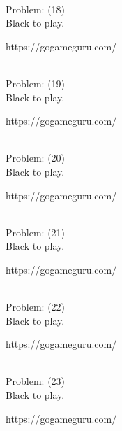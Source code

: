 \documentclass[11pt]{article}
\begin{document}
\begin{minipage}[t]{0.5\textwidth}
  {\centering
  
\\
Problem: (18)\\
Black to play.

https://gogameguru.com/\\
  }
\end{minipage}
\begin{minipage}[t]{0.5\textwidth}
  {\centering
  
\\
Problem: (19)\\
Black to play.

https://gogameguru.com/\\
  }
\end{minipage}
\begin{minipage}[t]{0.5\textwidth}
  {\centering
  
\\
Problem: (20)\\
Black to play.

https://gogameguru.com/\\
  }
\end{minipage}
\begin{minipage}[t]{0.5\textwidth}
  {\centering
  
\\
Problem: (21)\\
Black to play.

https://gogameguru.com/\\
  }
\end{minipage}
\begin{minipage}[t]{0.5\textwidth}
  {\centering
  
\\
Problem: (22)\\
Black to play.

https://gogameguru.com/\\
  }
\end{minipage}
\begin{minipage}[t]{0.5\textwidth}
  {\centering
  
\\
Problem: (23)\\
Black to play.

https://gogameguru.com/\\
  }
\end{minipage}
\end{document}
